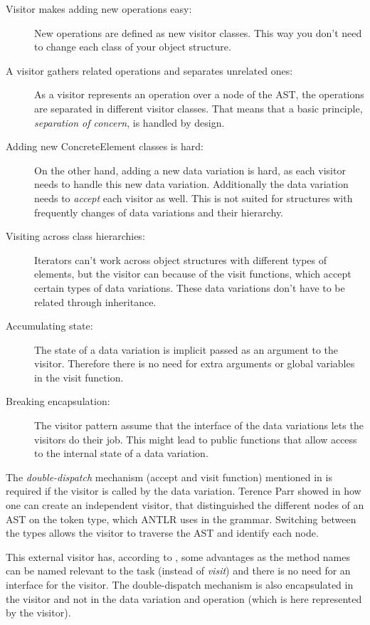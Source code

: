\documentclass{llncs}
\begin{document}
\begin{description}
	\item[Visitor makes adding new operations easy:] New operations are defined as new visitor classes. This way you don't need to change each class of your object structure.
	
	\item[A visitor gathers related operations and separates unrelated ones:] As a visitor represents an operation over a node of the AST, the operations are separated in different visitor classes. That means that a basic principle, \emph{separation of concern}, is handled by design.
	
	\item[Adding new ConcreteElement classes is hard:] On the other hand, adding a new data variation is hard, as each visitor needs to handle this new data variation. Additionally the data variation needs to \emph{accept} each visitor as well. This is not suited for structures with frequently changes of data variations and their hierarchy.
	
	\item[Visiting across class hierarchies:] Iterators can't work across object structures with different types of elements, but the visitor can because of the visit functions, which accept certain types of data variations. These data variations don't have to be related through inheritance.
	
	\item[Accumulating state:] The state of a data variation is implicit passed as an argument to the visitor. Therefore there is no need for extra arguments or global variables in the visit function.
	
	\item[Breaking encapsulation:] The visitor pattern assume that the interface of the data variations lets the visitors do their job. This might lead to public functions that allow access to the internal state of a data variation.
\end{description}

The \emph{double-dispatch} mechanism (accept and visit function) mentioned in \cite{GHJV94} is required if the visitor is called by the data variation. Terence Parr showed in \cite{Parr09} how one can create an independent visitor, that distinguished the different nodes of an AST on the token type, which ANTLR uses in the grammar. Switching between the types allows the visitor to traverse the AST and identify each node.

This external visitor has, according to \cite{Parr09}, some advantages as the method names can be named relevant to the task (instead of \emph{visit}) and there is no need for an interface for the visitor. The double-dispatch mechanism is also encapsulated in the visitor and not in the data variation and operation (which is here represented by the visitor). 
\end{document}
